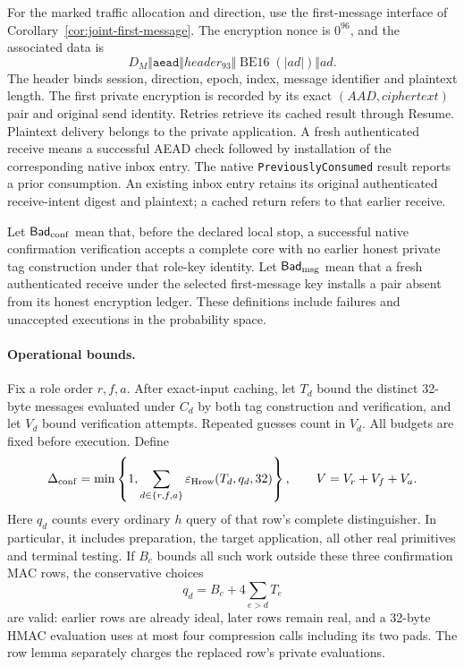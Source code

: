 For the marked traffic allocation and direction, use the first-message
interface of Corollary~\ref{cor:joint-first-message}. The encryption nonce
is $0^{96}$, and the associated data is
\[
 D_M\Vert\texttt{aead}\Vert\mathit{header}_{93}
       \Vert\operatorname{BE16}(|ad|)\Vert ad.
\]
The header binds session, direction, epoch, index, message identifier and
plaintext length. The first private encryption is recorded by its exact
$(\mathit{AAD},\mathit{ciphertext})$ pair and original send identity.
Retries retrieve its cached result through Resume. Plaintext delivery
belongs to the private application. A fresh authenticated receive means
a successful AEAD check followed by installation of the corresponding
native inbox entry. The native \texttt{PreviouslyConsumed} result reports
a prior consumption. An existing inbox entry retains its
original authenticated receive-intent digest and plaintext; a cached
return refers to that earlier receive.

Let $\mathsf{Bad}_{\rm conf}$ mean that, before the declared local stop,
a successful native confirmation verification accepts a complete core
with no earlier honest private tag construction under that role-key
identity. Let $\mathsf{Bad}_{\rm msg}$ mean that a fresh authenticated
receive under the selected first-message key installs a pair absent from
its honest encryption ledger. These definitions include failures and
unaccepted executions in the probability space.

\paragraph{Operational bounds.}
Fix a role order $r,f,a$. After exact-input caching, let $T_d$ bound the
distinct 32-byte messages evaluated under $C_d$ by both tag construction
and verification, and let $V_d$ bound verification attempts. Repeated
guesses count in $V_d$. All budgets are fixed before execution. Define
\begin{equation}
 \Delta_{\rm conf}=\min\left\{1,
       \sum_{d\in\{r,f,a\}}
          \varepsilon_{\rm Hrow}(T_d,q_d,32)\right\},
 \qquad V=V_r+V_f+V_a.
\label{eq:confirmation-row-cost}
\end{equation}
Here $q_d$ counts every ordinary $h$ query of that row's complete
distinguisher. In particular, it includes preparation, the target
application, all other real primitives and terminal testing. If $B_c$
bounds all such work outside these three confirmation MAC rows, the
conservative choices
\[
 q_d=B_c+4\sum_{e>d}T_e
\]
are valid: earlier rows are already ideal, later rows remain real, and a
32-byte HMAC evaluation uses at most four compression calls including
its two pads. The row lemma separately charges the replaced row's
private evaluations.

